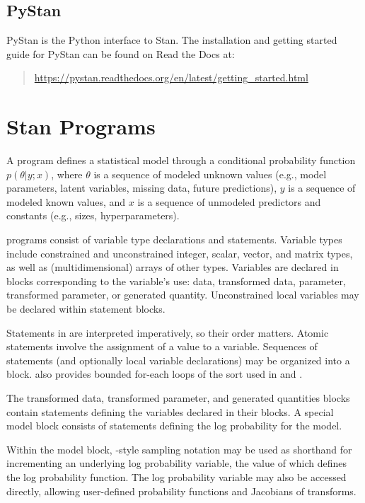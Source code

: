 \subsection{PyStan}

PyStan is the Python interface to Stan.  The installation and getting
started guide for PyStan can be found on Read the Docs at:

\begin{quote}
\url{https://pystan.readthedocs.org/en/latest/getting_started.html}
\end{quote}



\section{Stan Programs}

A \Stan program defines a statistical model through a conditional
probability function $p(\theta|y;x)$, where $\theta$ is a sequence of
modeled unknown values (e.g., model parameters, latent variables, missing
data, future predictions), $y$ is a sequence of modeled known 
values, and $x$ is a sequence of unmodeled predictors and constants
(e.g., sizes, hyperparameters).

\Stan programs consist of variable type declarations and statements.
Variable types include constrained and unconstrained integer, scalar,
vector, and matrix types, as well as (multidimensional) arrays of
other types.  Variables are declared in blocks corresponding to the
variable's use: data, transformed data, parameter, transformed
parameter, or generated quantity.  Unconstrained local variables may
be declared within statement blocks.

Statements in \Stan are interpreted imperatively, so their order
matters.  Atomic statements involve the assignment of a value to a
variable.  Sequences of statements (and optionally local variable
declarations) may be organized into a block.  \Stan also provides bounded
for-each loops of the sort used in \R and \BUGS.

The transformed data, transformed parameter, and generated quantities
blocks contain statements defining the variables declared in their
blocks.  A special model block consists of statements defining the log
probability for the model.

Within the model block, \BUGS-style sampling notation may be used as
shorthand for incrementing an underlying log probability variable, the
value of which defines the log probability function.  The log
probability variable may also be accessed directly, allowing
user-defined probability functions and Jacobians of transforms.


